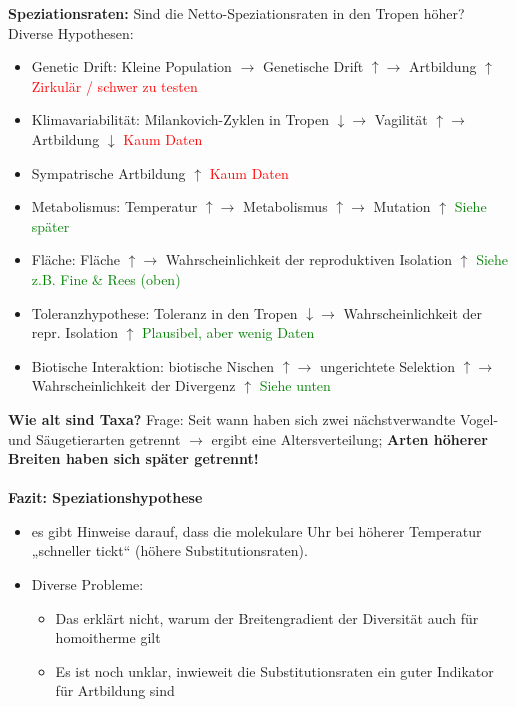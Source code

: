 \textbf{Speziationsraten:} Sind die Netto-Speziationsraten in den Tropen höher? Diverse Hypothesen:
\begin{itemize}
	\item Genetic Drift: Kleine Population $\rightarrow$ Genetische
Drift $\uparrow \rightarrow$ Artbildung $\uparrow$ \textcolor{red}{Zirkulär / schwer zu testen}
	\item Klimavariabilität: Milankovich-Zyklen in Tropen $\downarrow \rightarrow$ Vagilität $\uparrow \rightarrow$ Artbildung $\downarrow$ \textcolor{red}{Kaum Daten}
	\item Sympatrische Artbildung $\uparrow$ \textcolor{red}{Kaum Daten}
	\item Metabolismus: Temperatur $\uparrow \rightarrow$ Metabolismus $\uparrow \rightarrow$ Mutation $\uparrow$ \textcolor{green}{Siehe später}
	\item Fläche: Fläche $\uparrow \rightarrow$ Wahrscheinlichkeit der reproduktiven Isolation $\uparrow$ \textcolor{green}{Siehe z.B. Fine \& Rees (oben)}
	\item Toleranzhypothese: Toleranz in den Tropen $\downarrow \rightarrow$ Wahrscheinlichkeit der repr. Isolation $\uparrow$ \textcolor{green}{Plausibel, aber wenig Daten}
	\item Biotische Interaktion: biotische Nischen $\uparrow \rightarrow$ ungerichtete Selektion $\uparrow \rightarrow$ Wahrscheinlichkeit der Divergenz $\uparrow$ \textcolor{green}{Siehe unten}
\end{itemize}

\textbf{Wie alt sind Taxa?} Frage: Seit wann haben sich zwei nächstverwandte Vogel- und Säugetierarten getrennt $\rightarrow$ ergibt eine Altersverteilung; \textbf{Arten höherer Breiten haben sich später getrennt!}
\\\\
\textbf{Fazit: Speziationshypothese}
\begin{itemize}
	\item es gibt Hinweise darauf, dass die molekulare Uhr bei höherer Temperatur „schneller tickt“ (höhere Substitutionsraten).
	\item Diverse Probleme:
	\begin{itemize}
		\item Das erklärt nicht, warum der Breitengradient der Diversität auch für homoitherme gilt
		\item Es ist noch unklar, inwieweit die Substitutionsraten ein guter Indikator für Artbildung sind
	\end{itemize}
\end{itemize}

